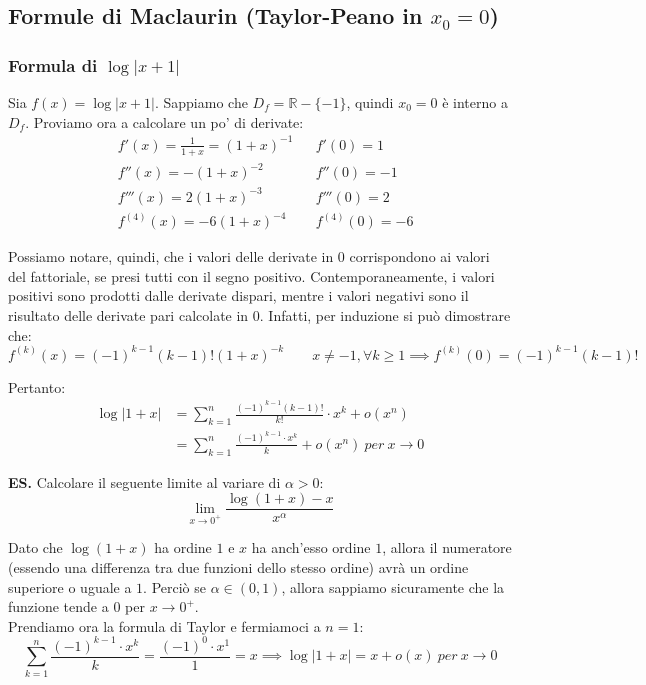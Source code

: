 \documentclass{article}
\begin{document}
\subsection{Formule di Maclaurin (Taylor-Peano in $x_0 = 0$)}
\subsubsection{Formula di $\log|x + 1|$}
Sia $f(x) = \log|x + 1|$. Sappiamo che $D_f = \mathbb{R} - \{-1\}$, quindi $x_0 = 0$ è interno a $D_f$. Proviamo ora a calcolare un po' di derivate:
\begin{align*}
    & f'(x) = \frac{1}{1 + x} = (1 + x)^{-1} && f'(0) = 1 \\
    & f''(x) = -(1 + x)^{-2} && f''(0) = -1 \\
    & f'''(x) = 2(1 + x)^{-3} && f'''(0) = 2 \\
    & f^{(4)}(x) = -6(1 + x)^{-4} && f^{(4)}(0) = -6
\end{align*}

\noindent Possiamo notare, quindi, che i valori delle derivate in $0$ corrispondono ai valori del fattoriale, se presi tutti con il segno positivo. Contemporaneamente, i valori positivi sono prodotti dalle derivate dispari, mentre i valori negativi sono il risultato delle derivate pari calcolate in $0$. Infatti, per induzione si può dimostrare che:
\begin{equation*}
    f^{(k)}(x) = (-1)^{k - 1}(k - 1)!(1 + x)^{-k} \qquad x \neq -1, \forall k \geq 1 \implies f^{(k)}(0) = (-1)^{k - 1}(k - 1)!
\end{equation*}

\noindent Pertanto:
\begin{align*}
    \log|1 + x| &= \sum_{k = 1}^n \frac{(-1)^{k - 1}(k - 1)!}{k!} \cdot x^k + o(x^n) \\
    &= \sum_{k = 1}^n \frac{(-1)^{k - 1} \cdot x^k}{k} + o(x^n) \ per \ x \to 0
\end{align*}

\noindent\textbf{ES.} Calcolare il seguente limite al variare di $\alpha > 0$:
\begin{equation*}
    \lim_{x \to 0^+} \frac{\log(1 + x) - x}{x^\alpha}
\end{equation*}

\noindent Dato che $\log(1 + x)$ ha ordine $1$ e $x$ ha anch'esso ordine $1$, allora il numeratore (essendo una differenza tra due funzioni dello stesso ordine) avrà un ordine superiore o uguale a $1$. Perciò se $\alpha \in (0, 1)$, allora sappiamo sicuramente che la funzione tende a $0$ per $x \to 0^+$. \\
Prendiamo ora la formula di Taylor e fermiamoci a $n = 1$:
\begin{equation*}
    \sum_{k = 1}^n \frac{(-1)^{k - 1} \cdot x^k}{k} = \frac{(-1)^0 \cdot x^1}{1} = x \implies \log|1 + x| = x + o(x) \ per \ x \to 0
\end{equation*}
\end{document}
